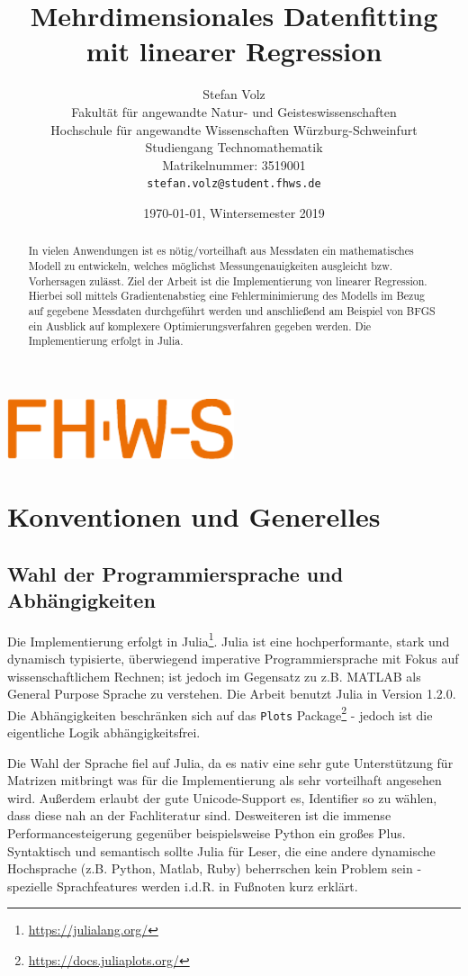 \documentclass{article}
\title{ Mehrdimensionales Datenfitting mit linearer Regression }
\author{
  Stefan Volz\\
  Fakultät für angewandte Natur- und Geisteswissenschaften\\
  Hochschule für angewandte Wissenschaften Würzburg-Schweinfurt\\
  Studiengang Technomathematik\\
  Matrikelnummer: 3519001\\
  \texttt{stefan.volz@student.fhws.de}\\
}
\date{\today, Wintersemester 2019}
\theoremstyle{plain} %
\theoremstyle{definition} %
\begin{document}
\begin{center}
  \includegraphics[width=0.5\textwidth]{FHWS}  
\end{center}

\maketitle

\begin{abstract}
  In vielen Anwendungen ist es nötig/vorteilhaft aus Messdaten ein mathematisches Modell zu entwickeln, welches möglichst Messungenauigkeiten ausgleicht bzw. Vorhersagen zulässt. Ziel der Arbeit ist die Implementierung von linearer Regression. Hierbei soll mittels Gradientenabstieg eine Fehlerminimierung des Modells im Bezug auf gegebene Messdaten durchgeführt werden und anschließend am Beispiel von BFGS ein Ausblick auf komplexere Optimierungsverfahren gegeben werden. Die Implementierung erfolgt in Julia.
\end{abstract}

\tableofcontents
\newpage

\section{Konventionen und Generelles}
\subsection{Wahl der Programmiersprache und Abhängigkeiten}
Die Implementierung erfolgt in Julia\footnote{\url{https://julialang.org/}}. Julia ist eine hochperformante, stark und dynamisch typisierte, überwiegend imperative Programmiersprache mit Fokus auf wissenschaftlichem Rechnen; ist jedoch im Gegensatz zu z.B. MATLAB als General Purpose Sprache zu verstehen. Die Arbeit benutzt Julia in Version 1.2.0. Die Abhängigkeiten beschränken sich auf das \texttt{Plots} Package\footnote{\url{https://docs.juliaplots.org/}} - jedoch ist die eigentliche Logik abhängigkeitsfrei.

Die Wahl der Sprache fiel auf Julia, da es nativ eine sehr gute Unterstützung für Matrizen mitbringt was für die Implementierung als sehr vorteilhaft angesehen wird. Außerdem erlaubt der gute Unicode-Support es, Identifier so zu wählen, dass diese nah an der Fachliteratur sind. Desweiteren ist die immense Performancesteigerung gegenüber beispielsweise Python ein großes Plus. Syntaktisch und semantisch sollte Julia für Leser, die eine andere dynamische Hochsprache (z.B. Python, Matlab, Ruby) beherrschen kein Problem sein - spezielle Sprachfeatures werden i.d.R. in Fußnoten kurz erklärt.
\end{document}
